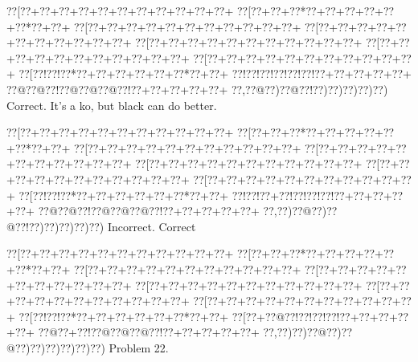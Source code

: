 \documentclass[a5paper]{article}
\begin{document}
\begin{center}
{\goo
\0??[\0??+\0??+\0??+\0??+\0??+\0??+\0??+\0??+\0??+\0??+\0??+
\0??[\0??+\0??+\0??*\0??+\0??+\0??+\0??+\0??+\0??*\0??+\0??+
\0??[\0??+\0??+\0??+\0??+\0??+\0??+\0??+\0??+\0??+\0??+\0??+
\0??[\0??+\0??+\0??+\0??+\0??+\0??+\0??+\0??+\0??+\0??+\0??+
\0??[\0??+\0??+\0??+\0??+\0??+\0??+\0??+\0??+\0??+\0??+\0??+
\0??[\0??+\0??+\0??+\0??+\0??+\0??+\0??+\0??+\0??+\0??+\0??+
\0??[\0??+\0??+\0??+\0??+\0??+\0??+\0??+\0??+\0??+\0??+\0??+
\0??[\0??!\0??!\0??*\0??+\0??+\0??+\0??+\0??+\0??*\0??+\0??+
\0??!\0??!\0??!\0??!\0??!\0??!\0??+\0??+\0??+\0??+\0??+
\0??@\0??@\0??!\0??@\0??@\0??@\0??!\0??+\0??+\0??+\0??+\0??+
\0??,\0??@\0??)\0??@\0??!\0??)\0??)\0??)\0??)\0??)
}
Correct. It's a ko, but black can do better. 

\end{center}
\begin{center}
{\goo
\0??[\0??+\0??+\0??+\0??+\0??+\0??+\0??+\0??+\0??+\0??+\0??+
\0??[\0??+\0??+\0??*\0??+\0??+\0??+\0??+\0??+\0??*\0??+\0??+
\0??[\0??+\0??+\0??+\0??+\0??+\0??+\0??+\0??+\0??+\0??+\0??+
\0??[\0??+\0??+\0??+\0??+\0??+\0??+\0??+\0??+\0??+\0??+\0??+
\0??[\0??+\0??+\0??+\0??+\0??+\0??+\0??+\0??+\0??+\0??+\0??+
\0??[\0??+\0??+\0??+\0??+\0??+\0??+\0??+\0??+\0??+\0??+\0??+
\0??[\0??+\0??+\0??+\0??+\0??+\0??+\0??+\0??+\0??+\0??+\0??+
\0??[\0??!\0??!\0??*\0??+\0??+\0??+\0??+\0??+\0??*\0??+\0??+
\0??!\0??!\0??+\0??!\0??!\0??!\0??!\0??+\0??+\0??+\0??+\0??+
\0??@\0??@\0??!\0??@\0??@\0??@\0??!\0??+\0??+\0??+\0??+\0??+
\0??,\0??)\0??@\0??)\0??@\0??!\0??)\0??)\0??)\0??)\0??)
}
Incorrect. Correct

\end{center}
\newpage
\begin{center}
{\goo
\0??[\0??+\0??+\0??+\0??+\0??+\0??+\0??+\0??+\0??+\0??+\0??+
\0??[\0??+\0??+\0??*\0??+\0??+\0??+\0??+\0??+\0??*\0??+\0??+
\0??[\0??+\0??+\0??+\0??+\0??+\0??+\0??+\0??+\0??+\0??+\0??+
\0??[\0??+\0??+\0??+\0??+\0??+\0??+\0??+\0??+\0??+\0??+\0??+
\0??[\0??+\0??+\0??+\0??+\0??+\0??+\0??+\0??+\0??+\0??+\0??+
\0??[\0??+\0??+\0??+\0??+\0??+\0??+\0??+\0??+\0??+\0??+\0??+
\0??[\0??+\0??+\0??+\0??+\0??+\0??+\0??+\0??+\0??+\0??+\0??+
\0??[\0??!\0??!\0??*\0??+\0??+\0??+\0??+\0??+\0??*\0??+\0??+
\0??[\0??+\0??@\0??!\0??!\0??!\0??!\0??+\0??+\0??+\0??+\0??+
\0??@\0??+\0??!\0??@\0??@\0??@\0??!\0??+\0??+\0??+\0??+\0??+
\0??,\0??)\0??)\0??@\0??)\0??@\0??)\0??)\0??)\0??)\0??)\0??)
}
Problem 22.

\end{center}
\end{document}

